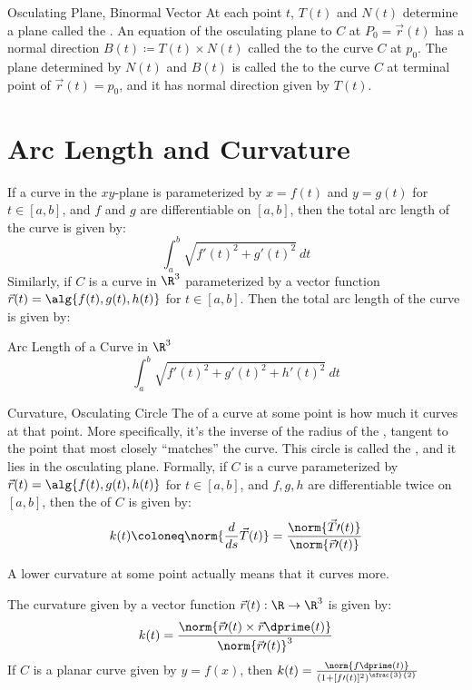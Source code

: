 \documentclass[math]{amznotes}
\begin{document}
\begin{dfnbox}{Osculating Plane, Binormal Vector}{}
    At each point $t$, $T(t)$ and $N(t)$ determine a plane called the . An equation of the osculating plane to $C$ at $P_0 = \vec{r}(t)$ has a normal direction $B(t) \coloneq T(t) \times N(t)$ called the  to the curve $C$ at $p_0$. The plane determined by $N(t)$ and $B(t)$ is called the  to the curve $C$ at terminal point of $\vec{r}(t) = p_0$, and it has normal direction given by $T(t)$.
\end{dfnbox}

\section{Arc Length and Curvature}
If a curve in the $xy$-plane is parameterized by $x=f(t)$ and $y=g(t)$ for $t \in [a,b]$, and $f$ and $g$ are differentiable on $[a,b]$, then the total arc length of the curve is given by:
\[ \int_a^b \sqrt{f\prime(t)^2 + g\prime(t)^2}\ dt\]
Similarly, if $C$ is a curve in $\R^3$ parameterized by a vector function $\vec{r}(t) = \alg{f(t), g(t), h(t)}$ for $t \in [a,b]$. Then the total arc length of the curve is given by:
\begin{genbox}{Arc Length of a Curve in $\R^3$}
\[ \int_a^b \sqrt{f\prime(t)^2 + g\prime(t)^2 + h\prime(t)^2}\ dt \]
\end{genbox}


\begin{dfnbox}{Curvature, Osculating Circle}{}
    The  of a curve at some point is how much it curves at that point. More specifically, it's the inverse of the radius of the , tangent to the point that most closely ``matches'' the curve. This circle is called the , and it lies in the osculating plane.
    \tcblower
    Formally, if $C$ is a curve parameterized by $\vec{r}(t) = \alg{f(t), g(t), h(t)}$ for $t \in [a,b]$, and $f,g,h$ are differentiable twice on $[a,b]$, then the  of $C$ is given by:
    \[ k(t) \coloneq \norm{\frac{d}{ds} \vec{T}(t)} = \frac{\norm{\vec{T}\prime(t)}}{\norm{\vec{r}\prime(t)}} \]
\end{dfnbox}

A lower curvature at some point actually means that it curves more.

\begin{thmbox}{}{}
    The curvature given by a vector function $\vec{r}(t) : \R \to \R^3$ is given by:
    \[ k(t) = \frac{\norm{\vec{r}\prime(t) \times \vec{r}\dprime(t)}}{\norm{\vec{r}\prime(t)}^3} \]
    If $C$ is a planar curve given by $y = f(x)$, then $k(t) = \frac{\norm{f\dprime(t)}}{\left( 1+[f\prime(t)]^2 \right)^{\sfrac{3}{2}}}$
\end{thmbox}
\end{document}
